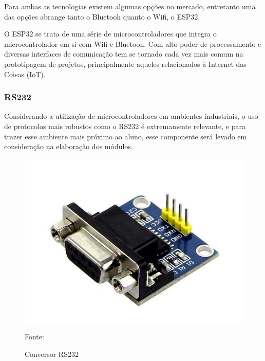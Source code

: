 Para ambas as tecnologias existem algumas opções no mercado, entretanto uma das opções abrange tanto o Bluetooh quanto o Wifi, o ESP32.

O ESP32 se trata de uma série de microcontroladores que integra o microcontrolador em si com Wifi e Bluetooh. Com alto poder de processamento e diversas interfaces de comunicação tem se tornado cada vez mais comum na prototipagem de projetos, principalmente aqueles relacionados à Internet das Coisas (IoT).

\subsubsection*{RS232}

Considerando a utilização de microcontroladores em ambientes industriais, o uso de protocolos mais robustos como o RS232 \cite{Semiconductor1998} é extremamente relevante, e para trazer esse ambiente mais próximo ao aluno, esse componente será levado em consideração na elaboração dos módulos.

\begin{figure}[h!]
  \centering
    \includegraphics[width=.5\textwidth]{figuras/rs232.jpg}
    \caption{Conversor RS232} Fonte: \cite{EletroGate2019b}
    \label{fig:rs232}
\end{figure}